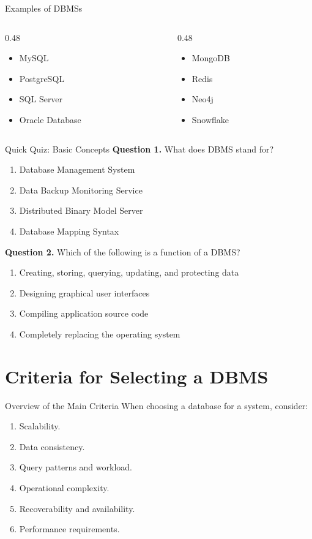 \documentclass[aspectratio=169,11pt]{beamer}
\newcommand{\smallitem}{\setlength{\itemsep}{2pt}\setlength{\parskip}{0pt}}
\newcommand{\qoption}[2]{\item[#1.] #2}
\begin{document}
\begin{frame}{Examples of DBMSs}
\begin{columns}[T]
\begin{column}{0.48\textwidth}
\begin{itemize}
  \smallitem
  \item MySQL
  \item PostgreSQL
  \item SQL Server
  \item Oracle Database
\end{itemize}
\end{column}
\begin{column}{0.48\textwidth}
\begin{itemize}
  \smallitem
  \item MongoDB
  \item Redis
  \item Neo4j
  \item Snowflake
\end{itemize}
\end{column}
\end{columns}
\end{frame}

\begin{frame}{Quick Quiz: Basic Concepts}
\small
\textbf{Question 1.} What does DBMS stand for?
\begin{enumerate}
  \qoption{A}{Database Management System}
  \qoption{B}{Data Backup Monitoring Service}
  \qoption{C}{Distributed Binary Model Server}
  \qoption{D}{Database Mapping Syntax}
\end{enumerate}

\textbf{Question 2.} Which of the following is a function of a DBMS?
\begin{enumerate}
  \qoption{A}{Creating, storing, querying, updating, and protecting data}
  \qoption{B}{Designing graphical user interfaces}
  \qoption{C}{Compiling application source code}
  \qoption{D}{Completely replacing the operating system}
\end{enumerate}
\end{frame}

\section{Criteria for Selecting a DBMS}

\begin{frame}{Overview of the Main Criteria}
When choosing a database for a system, consider:
\begin{enumerate}
  \smallitem
  \item Scalability.
  \item Data consistency.
  \item Query patterns and workload.
  \item Operational complexity.
  \item Recoverability and availability.
  \item Performance requirements.
\end{enumerate}
\end{frame}
\end{document}
